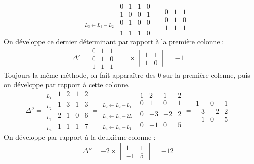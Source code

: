 {{$$\begin{array}{l|cccc|}
\end{array}
= \begin{array}{l|cccc|}  & 0 & 1 & 1 & 0\\  & 1 & 0 & 0 & 1\\ _{L_3 \leftarrow L_3-L_2} & 0 & 1 & 0 & 0 \\  & 1 & 1 & 1 &0  
\end{array}
= \begin{array}{|ccc|}  0 & 1 & 1 \\  0 & 1 & 0  \\   1 & 1 & 1  
\end{array}
$$
On développe ce dernier déterminant par rapport à la première colonne :
$$ \Delta'=\begin{array}{|ccc|}  0 & 1 & 1 \\  0 & 1 & 0  \\   1 & 1 & 1  
\end{array} = 1 \times \begin{vmatrix} 1 & 1 \\ 1 & 0 \end{vmatrix} = -1$$
Toujours la même méthode, on fait apparaître des $0$ sur la première colonne, puis on développe par rapport à cette colonne.
$$
\Delta''= \begin{array}{l|cccc|} 
_{L_1} & 1 & 2 & 1 & 2\\  _{L_2} &1 & 3 & 1 & 3\\  _{L_3} &2 & 1 & 0& 6\\  _{L_4} &1 & 1& 1&7\end{array}
=\begin{array}{l|cccc|}  & 1 & 2 & 1 & 2\\  _{L_2\leftarrow L_2-L_1} &0 & 1 & 0 & 1\\  _{L_3\leftarrow L_3-2L_1} & 0 & -3 & -2 & 2 \\ 
 _{L_4\leftarrow L_4-L_1} & 0 & -1 & 0 & 5 \end{array}
= \begin{array}{|ccc|} 1 & 0 & 1\\-3 & -2 & 2 \\ -1 & 0 & 5 \end{array}
$$
On développe par rapport à la deuxième colonne :
$$\Delta''= -2 \times \begin{vmatrix}  1 & 1 \\ -1 & 5 \end{vmatrix} = -12$$
}
}
